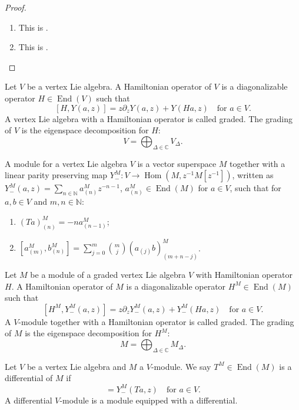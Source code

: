 \documentclass[a4paper, 12pt, reqno]{amsart}
\theoremstyle{remark}
\numberwithin{equation}{subsection}
\DeclareMathOperator{\End}{End}
\DeclareMathOperator{\Hom}{Hom}
\begin{document}
\begin{proof}\leavevmode
  \begin{enumerate}
  \item This is .
  \item This is . \qedhere
  \end{enumerate}
\end{proof}

Let $V$ be a vertex Lie algebra.
A Hamiltonian operator of $V$ is a diagonalizable operator $H \in \End(V)$ such that
\begin{equation}
  \label{eq:50}
  [H, Y(a, z)] = z\partial_zY(a, z) + Y(Ha, z) \quad \text{for }a \in V.
\end{equation}
A vertex Lie algebra with a Hamiltonian operator is called graded.
The grading of $V$ is the eigenspace decomposition for $H$:
\begin{equation*}
  V = \bigoplus_{\Delta \in \mathbb{C}}V_{\Delta}.
\end{equation*}

A module for a vertex Lie algebra $V$ is a vector superspace $M$ together with a linear parity preserving map $Y^M_-: V \to \Hom(M, z^{-1}M[z^{-1}])$, written as $Y^M_-(a, z) = \sum_{n \in \mathbb{N}}a^M_{(n)}z^{-n - 1}$, $a^M_{(n)} \in \End(M)$ for $a \in V$, such that for $a, b \in V$ and $m, n \in \mathbb{N}$:
\begin{enumerate}
\item $(Ta)^M_{(n)} = -na^M_{(n - 1)}$;
\item $[a^M_{(m)}, b^M_{(n)}] = \sum_{j = 0}^m\binom{m}{j}(a_{(j)}b)^M_{(m + n - j)}$.
\end{enumerate}

Let $M$ be a module of a graded vertex Lie algebra $V$ with Hamiltonian operator $H$. 
A Hamiltonian operator of $M$ is a diagonalizable operator $H^M \in \End(M)$ such that
\begin{equation}
  \label{eq:28}
  [H^M, Y^M_-(a, z)] = z\partial_zY^M_-(a, z) + Y^M_-(Ha, z) \quad \text{for }a \in V.
\end{equation}
A $V$-module together with a Hamiltonian operator is called graded.
The grading of $M$ is the eigenspace decomposition for $H^M$:
\begin{equation*}
  M = \bigoplus_{\Delta \in \mathbb{C}}M_{\Delta}.
\end{equation*}



Let $V$ be a vertex Lie algebra and $M$ a $V$-module.
We say $T^M \in \End(M)$ is a differential of $M$ if
\begin{equation*}
  [T^M, Y^M_-(a, z)] = Y^M_-(Ta, z) \quad \text{for }a \in V.
\end{equation*}
A differential $V$-module is a module equipped with a differential.

\printindex



\end{document}
